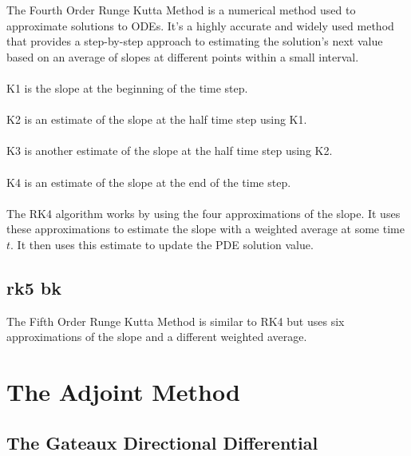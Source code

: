 \documentclass[12pt]{article}
\begin{document}
\begin{flushleft}
The Fourth Order Runge Kutta Method is a numerical method used to approximate solutions to ODEs. It's a highly accurate and widely used method that provides a step-by-step approach to estimating the solution's next value based on an average of slopes at different points within a small interval. 
\\~\\
K1 is the slope at the beginning of the time step.
\\~\\
K2 is an estimate of the slope at the half time step using K1.
\\~\\
K3 is another estimate of the slope at the half time step using K2.
\\~\\
K4 is an estimate of the slope at the end of the time step.
\\~\\
The RK4 algorithm works by using the four approximations of the slope. It uses these approximations to estimate the slope with a weighted average at some time $t$. It then uses this estimate to update the PDE solution value.


\subsection{rk5 bk}

The Fifth Order Runge Kutta Method is similar to RK4 but uses six approximations of the slope and a different weighted average.

 
\section{The Adjoint Method} 
\subsection{The Gateaux Directional Differential}


\end{flushleft}
\end{document}
